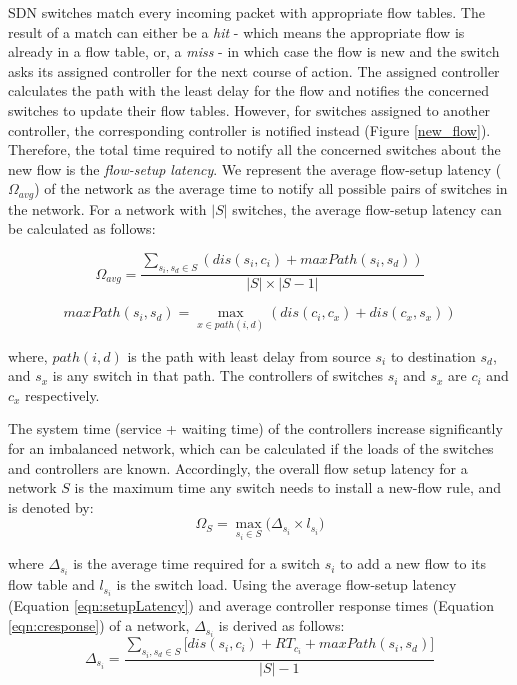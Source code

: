 \documentclass[a4paper,fleqn]{cas-dc}
\begin{document}
\noindent SDN switches match every incoming packet with appropriate flow tables. The result of a match can either be a \textit{hit} - which means the appropriate flow is already in a flow table, or, a \textit{miss} - in which case the flow is new and the switch asks its assigned controller for the next course of action. The assigned controller calculates the path with the least delay for the flow and notifies the concerned switches to update their flow tables. However, for switches assigned to another controller, the corresponding controller is notified instead (Figure \ref{new_flow}). Therefore, the total time required to notify all the concerned switches about the new flow is the \textit{flow-setup latency}. We represent the average flow-setup latency ($\Omega_{avg}$) of the network as the average time to notify all possible pairs of switches in the network. For a network with $|S|$ switches, the average flow-setup latency can be calculated as follows:

\begin{equation} \label{eqn:setupLatency}
\Omega_{avg} = \frac{\sum_{s_i,s_d\in S} \left(dis(s_i,c_i)+ maxPath(s_i,s_d)\right)}{|S|\times |S-1|}
\end{equation}

\begin{equation}
maxPath(s_i,s_d) = \max_{x\in path(i,d)}\left(dis(c_i,c_x)+dis(c_x,s_x) \right)
\end{equation}

where, $path(i,d)$ is the path with least delay from source $s_i$ to destination $s_d$, and $s_x$ is any switch in that path. The controllers of switches $s_i$ and $s_x$ are $c_i$ and $c_x$ respectively.

The system time (service + waiting time) of the controllers increase significantly for an imbalanced network, which can be calculated if the loads of the switches and controllers are known. Accordingly, the overall flow setup latency for a network $S$ is the maximum time any switch needs to install a new-flow rule, and is denoted by:
\begin{equation}
\Omega_S = \max_{s_i\in S} \bigg( \Delta_{s_i}\times l_{s_i} \bigg)
\end{equation}

where $\Delta_{s_i}$ is the average time required for a switch $s_i$ to add a new flow to its flow table and $l_{s_i}$ is the switch load. Using the average flow-setup latency (Equation \ref{eqn:setupLatency}) and average controller response times (Equation \ref{eqn:cresponse}) of a network, $\Delta_{s_i}$ is derived as follows:
\begin{equation}
\Delta_{s_i} = \frac{\sum_{s_i,s_d\in S} \bigg[dis(s_i,c_i)+RT_{c_i}+maxPath(s_i,s_d) \bigg]}{|S|-1}
\end{equation}
\end{document}
